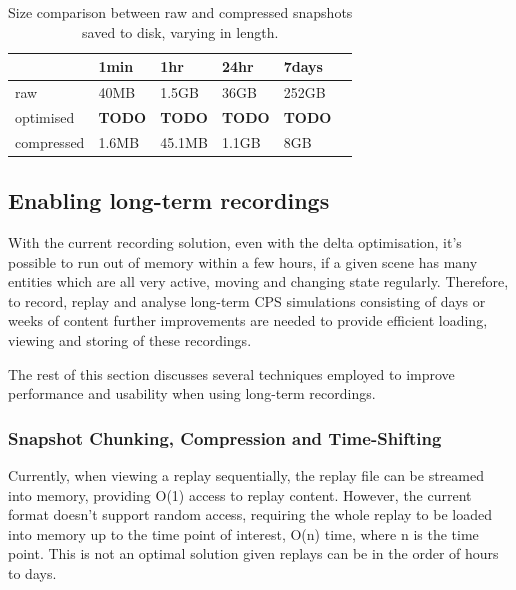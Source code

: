 \begin{table}[h]
\centering
\caption{Size comparison between raw and compressed snapshots saved to disk, varying in length.}
\begin{tabular}{|l|l|l|l|l|l|}
\hline
           & 1min  & 1hr    & 24hr  & 7days\\ \hline
raw        & 40MB  & 1.5GB  & 36GB  & 252GB\\ \hline
optimised  &\textbf{TODO}&\textbf{TODO}&\textbf{TODO}&\textbf{TODO}\\ \hline     
compressed & 1.6MB & 45.1MB & 1.1GB & 8GB\\ \hline
\end{tabular}
\label{tab:offline-storage}
\end{table}

\subsection{Enabling long-term recordings} %
\label{sub:enabling_long_term_recordings}
With the current recording solution, even with the delta optimisation, it's possible to run out of memory within a few hours, if a given scene has many entities which are all very active, moving and changing state regularly. Therefore, to record, replay and analyse long-term CPS simulations consisting of days or weeks of content further improvements are needed to provide efficient loading, viewing and storing of these recordings. 

The rest of this section discusses several techniques employed to improve performance and usability when using long-term recordings.

\subsubsection{Snapshot Chunking, Compression and Time-Shifting} %
\label{sub:chunked_compression}
Currently, when viewing a replay sequentially, the replay file can be streamed into memory, providing O(1) access to replay content. However, the current format doesn't support random access, requiring the whole replay to be loaded into memory up to the time point of interest, O(n) time, where n is the time point. This is not an optimal solution given replays can be in the order of hours to days.

